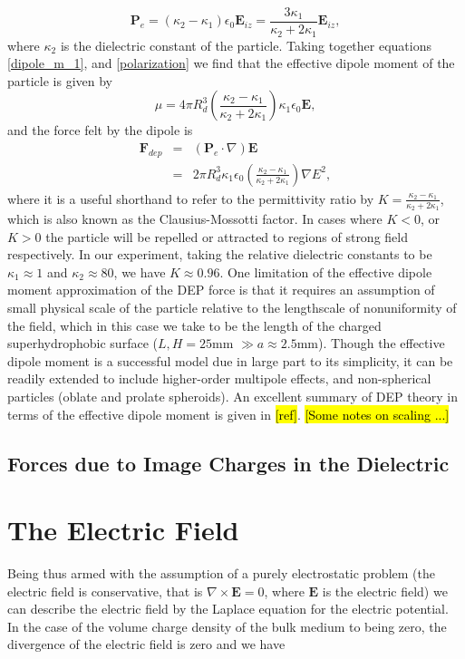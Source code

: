 \documentclass[a4paper, 12pt]{article}
\begin{document}
\begin{equation} \label{polarization}
\mathbf{P}_e = \left( \kappa_2 - \kappa_1 \right) \epsilon_0 \mathbf{E}_{iz} = \frac{3 \kappa_1}{\kappa_2 +2\kappa_1}\mathbf{E}_{iz},
\end{equation}
where $\kappa_2$ is the dielectric constant of the particle. Taking together equations \ref{dipole_m_1}, and \ref{polarization} we find that the effective dipole moment of the particle is given by 
\begin{equation}\label{dipole_m_2}
\mu = 4 \pi R_d^3 \left( \frac{\kappa_2 - \kappa_1}{\kappa_2 + 2 \kappa_1} \right) \kappa_1 \epsilon_0 \mathbf{E},
\end{equation}
and the force felt by the dipole is 
\begin{eqnarray} \label{dep_force}
\mathbf{F}_{dep} &=& \left( \mathbf{P}_e \cdot \nabla \right) \mathbf{E}\\
&=& 2 \pi R_d^3 \kappa_1 \epsilon_0 \left( \frac{\kappa_2 - \kappa_1}{\kappa_2 + 2 \kappa_1} \right) \nabla E^2,
\end{eqnarray}
where it is a useful shorthand to refer to the permittivity ratio by $K = \frac{\kappa_2 - \kappa_1}{\kappa_2 + 2 \kappa_1}$, which is also known as the Clausius-Mossotti factor. In cases where $K < 0$, or $K>0$ the particle will be repelled or attracted to regions of strong field respectively. In our experiment, taking the relative dielectric constants to be $\kappa_1 \approx 1$ and $\kappa_2 \approx 80$, we have $K \approx 0.96$. One limitation of the effective dipole moment approximation of the DEP force is that it requires an assumption of small physical scale of the particle relative to the lengthscale of nonuniformity of the field, which in this case we take to be the length of the charged superhydrophobic surface ($L,H =25$mm $\gg a \approx 2.5$mm). Though the effective dipole moment is a successful model due in large part to its simplicity, it can be readily extended to include higher-order multipole effects, and non-spherical particles (oblate and prolate spheroids). An excellent summary of DEP theory in terms of the effective dipole moment is given in \hl{[ref]}. \hl{[Some notes on scaling ...]}

\subsection{Forces due to Image Charges in the Dielectric}

\section{The Electric Field}
Being thus armed with the assumption of a purely electrostatic problem (the electric field is conservative, that is $\nabla \times \mathbf{E} = 0$, where $\mathbf{E}$ is the electric field) we can describe the electric field by the Laplace equation for the electric potential. In the case of the volume charge density of the bulk medium to being zero, the divergence of the electric field is zero and we have
\end{document}
